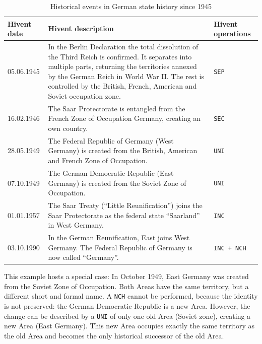 \begin{table}[ht]
\begin{center}
\begin{tabular}{l p{8.8cm} l}
  \toprule
  Hivent date & Hivent description & Hivent operations \\
  \midrule

    05.06.1945
  & \normalsize{In the Berlin Declaration the total dissolution of the Third Reich is confirmed. It separates into multiple parts, returning the territories annexed by the German Reich in World War II. The rest is controlled by the British, French, American and Soviet occupation zone.}
  & \texttt{SEP} \\[1.5em]

    16.02.1946
  & \normalsize{The Saar Protectorate is entangled from the French Zone of Occupation Germany, creating an own country.}
  & \texttt{SEC} \\[1.5em]

    28.05.1949
  & \normalsize{The Federal Republic of Germany (West Germany) is created from the British, American and French Zone of Occupation.}
  & \texttt{UNI} \\[1.5em]

    07.10.1949
  & \normalsize{The German Democratic Republic (East Germany) is created from the Soviet Zone of Occupation.}
  & \texttt{UNI} \\[1.5em]

    01.01.1957
  & \normalsize{The Saar Treaty (``Little Reunification'') joins the Saar Protectorate as the federal state ``Saarland'' in West Germany.}
  & \texttt{INC} \\[1.5em]

    03.10.1990
  & \normalsize{In the German Reunification, East joins West Germany. The Federal Republic of Germany is now called ``Germany''.}
  & \texttt{INC + NCH} \\[1.5em]

  \bottomrule
\end{tabular}
\caption{Historical events in German state history since 1945}
\label{tab:german_history_since_1945}
\end{center}
\end{table}

\vspace{-1em}

This example hosts a special case: In October 1949, East Germany was created from the Soviet Zone of Occupation. Both Areas have the same territory, but a different short and formal name. A \texttt{NCH} cannot be performed, because the identity is not preserved: the German Democratic Republic is a new Area. However, the change can be described by a \texttt{UNI} of only one old Area (Soviet zone), creating a new Area (East Germany). This new Area occupies exactly the same territory as the old Area and becomes the only historical successor of the old Area.

